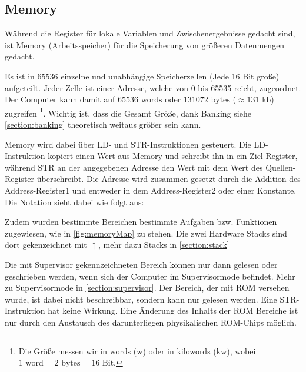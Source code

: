 \documentclass{scrartcl}
\begin{document}
\subsection{\label{section:memory}Memory}

Während die Register für lokale Variablen und Zwischenergebnisse gedacht sind, ist Memory (Arbeitsspeicher) für die Speicherung von größeren Datenmengen gedacht.

Es ist in 65536 einzelne und unabhängige Speicherzellen (Jede 16 Bit große) aufgeteilt. Jeder Zelle ist einer Adresse, welche von 0 bis 65535 reicht, zugeordnet. Der Computer kann damit auf $65536 \text{ words}$ oder $131072 \text{ bytes}$ ($\approx 131 \text{ kb}$) zugreifen
\footnote{Die Größe messen wir in words (w) oder in kilowords (kw), wobei $1 \text{ word} = 2 \text{ bytes} = 16 \text{ Bit}$.}. Wichtig ist, dass die Gesamt Größe, dank Banking siehe \autoref{section:banking} theoretisch weitaus größer sein kann.

Memory wird dabei über LD- und STR-Instruktionen gesteuert. Die LD-Instruktion kopiert einen Wert aus Memory und schreibt ihn in ein Ziel-Register, während STR an der angegebenen Adresse den Wert mit dem Wert des Quellen-Register überschreibt. Die Adresse wird zusammen gesetzt durch die Addition des Address-Register1 und entweder in dem Address-Register2 oder einer Konstante. Die Notation sieht dabei wie folgt aus:






Zudem wurden bestimmte Bereichen bestimmte Aufgaben bzw. Funktionen zugewiesen, wie in \autoref{fig:memoryMap} zu stehen. Die zwei Hardware Stacks sind dort gekenzeichnet mit $\uparrow$, mehr dazu Stacks in \autoref{section:stack}

Die mit Supervisor gekennzeichneten Bereich können nur dann gelesen oder geschrieben werden, wenn sich der Computer im Supervisormode befindet. Mehr zu Supervisormode in \autoref{section:supervisor}. Der Bereich, der mit ROM versehen wurde, ist dabei nicht beschreibbar, sondern kann nur gelesen werden. Eine STR-Instruktion hat keine Wirkung. Eine Änderung des Inhalts der ROM Bereiche ist nur durch den Austausch des darunterliegen physikalischen ROM-Chips möglich.
\end{document}
